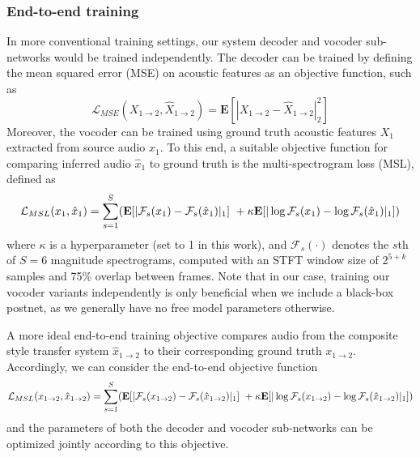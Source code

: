 \documentclass{article}
\begin{document}
\begin{sloppy}
\subsubsection{End-to-end training}
\label{sssec:e2e}
In more conventional training settings, our system decoder and vocoder sub-networks would be trained independently.  The decoder can be trained by defining the mean squared error (MSE) on acoustic features as an objective function, such as
\begin{equation} \label{eqn:mse}
\mathcal{L}_{MSE}(X_{1\rightarrow2}, \hat{X}_{1\rightarrow2}) = \mathbf{E}[|X_{1\rightarrow2}-\hat{X}_{1\rightarrow2}|^2_2]
\end{equation}
Moreover, the vocoder can be trained using ground truth acoustic features $X_1$ extracted from source audio $x_1$.  To this end, a suitable objective function for comparing inferred audio $\hat{x}_1$ to ground truth is the multi-spectrogram loss (MSL), defined as
\begin{equation}
\mathcal{L}_{MSL}(x_1, \hat{x}_1) = \sum_{s=1}^{S} ( \mathbf{E}[|\mathcal{F}_{s}(x_1)-\mathcal{F}_{s}(\hat{x}_1)|_1]~+ \\ \kappa \mathbf{E}[|\log{\mathcal{F}_{s}(x_1)}-\log{\mathcal{F}_{s}(\hat{x}_1)}|_1])
\end{equation}
where $\kappa$ is a hyperparameter (set to 1 in this work), and $\mathcal{F}_s(\cdot)$ denotes the $s$th of $S=6$ magnitude spectrograms, computed with an STFT window size of $2^{5+k}$ samples and 75\% overlap between frames.  Note that in our case, training our vocoder variants independently is only beneficial when we include a black-box postnet, as we generally have no free model parameters otherwise.

A more ideal end-to-end training objective compares audio from the composite style transfer system $\hat{x}_{1\rightarrow2}$ to their corresponding ground truth $x_{1\rightarrow2}$. Accordingly, we can consider the end-to-end objective function
\begin{equation} 
\mathcal{L}_{MSL}(x_{1\rightarrow2}, \hat{x}_{1\rightarrow2}) = \sum_{s=1}^{S} ( \mathbf{E}[|\mathcal{F}_{s}(x_{1\rightarrow2})-\mathcal{F}_{s}(\hat{x}_{1\rightarrow2})|_1]~+ \\ \kappa \mathbf{E}[|\log{\mathcal{F}_{s}(x_{1\rightarrow2})}-\log{\mathcal{F}_{s}(\hat{x}_{1\rightarrow2})}|_1])
\end{equation}
and the parameters of both the decoder and vocoder sub-networks can be optimized jointly according to this objective.


\end{sloppy}
\end{document}
